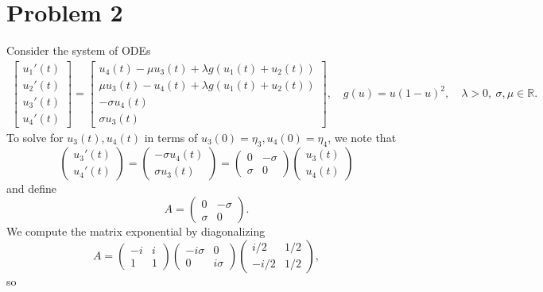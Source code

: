 \documentclass{article}
\begin{document}
\section{Problem 2}
Consider the system of ODEs
\begin{align*}
	\begin{bmatrix} u_1'(t) \\ u_2'(t) \\ u_3'(t) \\ u_4'(t) \end{bmatrix} = \begin{bmatrix} u_4(t) - \mu u_3(t) + \lambda g(u_1(t) + u_2(t))\\
		\mu u_3(t) - u_4(t) +  \lambda g(u_1(t) + u_2(t))\\
		- \sigma u_4(t) \\
		\sigma  u_3(t) \end{bmatrix}, \quad g(u) = u (1-u)^2, \quad \lambda > 0, ~ \sigma, \mu \in \mathbb R.
\end{align*}
To solve for $u_3(t),u_4(t)$ in terms of $u_3(0) = \eta_3,u _4(0) = \eta_4$, we note that
\[
\begin{pmatrix}
	u_3'(t)\\u_4'(t)
\end{pmatrix}=\begin{pmatrix}
-\sigma u_4(t)\\\sigma u_3(t)
\end{pmatrix}=\begin{pmatrix}
0 &-\sigma\\ \sigma &0
\end{pmatrix}\begin{pmatrix}
u_3(t)\\u_4(t)
\end{pmatrix}
\]
and define 
\[
A=\begin{pmatrix}
	0 &-\sigma\\ \sigma &0
\end{pmatrix}.
\]
We compute the matrix exponential by diagonalizing
\[
A = \begin{pmatrix}
-i &i\\ 1 &1
\end{pmatrix}\begin{pmatrix}
-i\sigma &0\\ 0 &i\sigma
\end{pmatrix}\begin{pmatrix}
i/2 &1/2\\-i/2 &1/2
\end{pmatrix},
\]
so 
\end{document}
